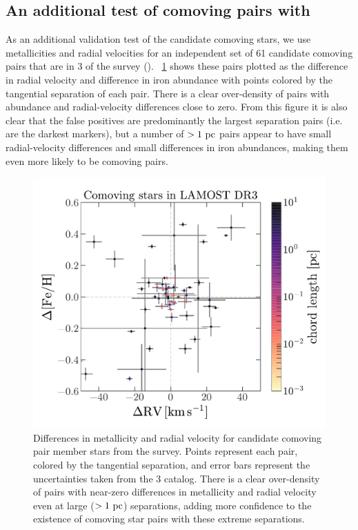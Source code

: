 \documentclass[modern, letterpaper]{aastex61}
\newcommand{\DR}[1]{\acronym{DR}#1}
\begin{document}
\subsection{An additional test of comoving pairs with }

As an additional validation test of the candidate comoving stars, we use
metallicities and radial velocities for an independent set of 61 candidate
comoving pairs that are in \DR{3} of the  survey
(\citealt{Deng:2012}).
\figurename~\ref{fig:lamost} shows these pairs plotted as the difference in
radial velocity and difference in iron abundance with points colored by the
tangential separation of each pair.
There is a clear over-density of pairs with abundance and radial-velocity
differences close to zero.
From this figure it is also clear that the false positives are predominantly the
largest separation pairs (i.e. are the darkest markers), but a number of
$>1~\mathrm{pc}$ pairs appear to have small radial-velocity differences and small
differences in iron abundances, making them even more likely to be comoving
pairs.

\begin{figure}[htbp]
  \begin{center}
    \includegraphics[width=0.65\linewidth]{lamost.pdf}
  \end{center}
  \caption{%
    Differences in metallicity and radial velocity for candidate comoving pair
    member stars from the  survey.
    Points represent each pair, colored by the tangential separation, and
    error bars represent the uncertainties taken from the 
    \DR{3} catalog.
    There is a clear over-density of pairs with near-zero differences in
    metallicity and radial velocity even at large ($>1~\mathrm{pc}$) separations, adding
    more confidence to the existence of comoving star pairs with these extreme
    separations.
    \label{fig:lamost}}
\end{figure}
\end{document}
